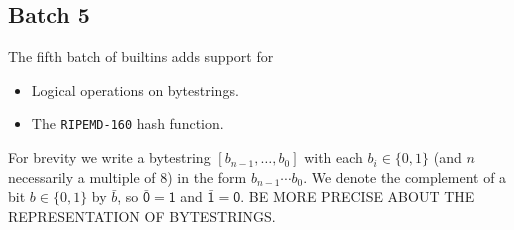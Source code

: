 \renewcommand{\note}[1]{
  \bigskip
  \refstepcounter{notenumberE}
  \noindent\textbf{Note \thenotenumberE. #1}
}

\subsection{Batch 5}
\label{sec:default-builtins-5}
The fifth batch of builtins adds support for
\begin{itemize}
\item Logical operations on bytestrings.
\item The \texttt{RIPEMD-160} hash function.
\end{itemize}

\noindent For brevity we write a bytestring $[b_{n-1}, \ldots, b_0]$ with each $b_i \in \{0,1\}$
(and $n$ necessarily a multiple of 8) in the form $b_{n-1}\cdots b_0$.  We denote the complement
of a bit $b \in \{0,1\}$ by $\bar{b}$, so $\bar{\textsf{0}} = \textsf{1}$ and
$\bar{\textsf{1}} = \textsf{0}$. BE MORE PRECISE ABOUT THE REPRESENTATION OF BYTESTRINGS.


